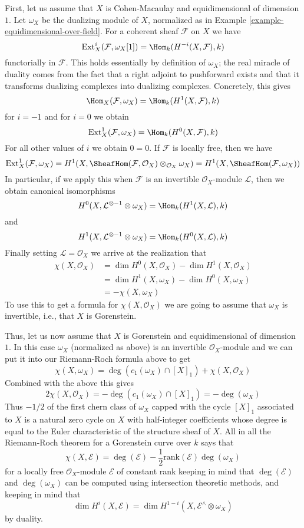 \medskip\noindent
First, let us assume that $X$ is Cohen-Macaulay and equidimensional of
dimension $1$. Let $\omega_X$ be the dualizing module of $X$, normalized
as in Example \ref{example-equidimensional-over-field}. For a coherent
sheaf $\mathcal{F}$ on $X$ we have
$$
\text{Ext}^i_X(\mathcal{F}, \omega_X[1]) = \Hom_k(H^{-i}(X, \mathcal{F}), k)
$$
functorially in $\mathcal{F}$. This holds essentially by definition of
$\omega_X$; the real miracle of duality comes from the fact that a
right adjoint to pushforward exists and that it transforms dualizing complexes
into dualizing complexes. Concretely, this gives
$$
\Hom_X(\mathcal{F}, \omega_X) = \Hom_k(H^1(X, \mathcal{F}), k)
$$
for $i = -1$ and for $i = 0$ we obtain
$$
\text{Ext}^1_X(\mathcal{F}, \omega_X) = \Hom_k(H^0(X, \mathcal{F}), k)
$$
For all other values of $i$ we obtain $0 = 0$.
If $\mathcal{F}$ is locally free, then we
have
$$
\text{Ext}^1_X(\mathcal{F}, \omega_X) =
H^1(X, \SheafHom(\mathcal{F}, \mathcal{O}_X) \otimes_{\mathcal{O}_X} \omega_X)
=
H^1(X, \SheafHom(\mathcal{F}, \omega_X))
$$
In particular, if we apply this when $\mathcal{F}$ is an invertible
$\mathcal{O}_X$-module $\mathcal{L}$, then we obtain canonical isomorphisms
$$
H^0(X, \mathcal{L}^{\otimes - 1} \otimes \omega_X) =
\Hom_k(H^1(X, \mathcal{L}), k)
$$
and
$$
H^1(X, \mathcal{L}^{\otimes - 1} \otimes \omega_X) =
\Hom_k(H^0(X, \mathcal{L}), k)
$$
Finally setting $\mathcal{L} = \mathcal{O}_X$ we arrive at the
realization that
\begin{align*}
\chi(X, \mathcal{O}_X)
& =
\dim H^0(X, \mathcal{O}_X) - \dim H^1(X, \mathcal{O}_X) \\
& =
\dim H^1(X, \omega_X) - \dim H^0(X, \omega_X) \\
& =
-\chi(X, \omega_X)
\end{align*}
To use this to get a formula for $\chi(X, \mathcal{O}_X)$ we are
going to assume that $\omega_X$ is invertible, i.e., that $X$ is Gorenstein.

\medskip\noindent
Thus, let us now assume that $X$ is Gorenstein and equidimensional of
dimension $1$. In this case $\omega_X$ (normalized as above) is an
invertible $\mathcal{O}_X$-module and we can put it into our Riemann-Roch
formula above to get
$$
\chi(X, \omega_X) = 
\deg(c_1(\omega_X) \cap [X]_1) + \chi(X, \mathcal{O}_X)
$$
Combined with the above this gives
$$
2\chi(X, \mathcal{O}_X) = - \deg(c_1(\omega_X) \cap [X]_1) = - \deg(\omega_X)
$$
Thus $-1/2$ of the first chern class of $\omega_X$ capped with the
cycle $[X]_1$ associated to $X$ is a natural zero
cycle on $X$ with half-integer coefficients whose degree is equal to
the Euler characteristic of the structure sheaf of $X$.
All in all the Riemann-Roch theorem for a Gorenstein curve over $k$
says that
$$
\chi(X, \mathcal{E}) = \deg(\mathcal{E}) -
\frac{1}{2} \text{rank}(\mathcal{E}) \deg(\omega_X)
$$
for a locally free $\mathcal{O}_X$-module $\mathcal{E}$ of constant rank
keeping in mind that $\deg(\mathcal{E})$ and $\deg(\omega_X)$ can be
computed using intersection theoretic methods, and keeping in mind that
$$
\dim H^i(X, \mathcal{E}) =
\dim H^{1 - i}(X, \mathcal{E}^\wedge \otimes \omega_X)
$$
by duality.







